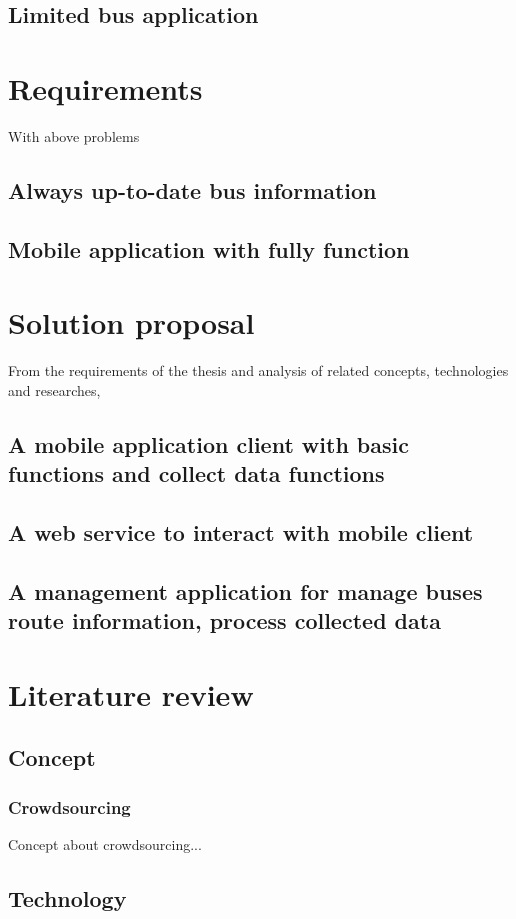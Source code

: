 \subsection{Limited bus application}
	
\section{Requirements}
With above problems
\subsection{Always up-to-date bus information}
\subsection{Mobile application with fully function}


\section{Solution proposal}
From the requirements of the thesis and analysis of related concepts, technologies and researches, 
\subsection{A mobile application client with basic functions and collect data functions}
\subsection{A web service to interact with mobile client}
\subsection{A management application for manage buses route information, process collected data}


\section{Literature review}
\subsection{Concept}
\subsubsection{Crowdsourcing}
	Concept about crowdsourcing...
\subsection{Technology}
